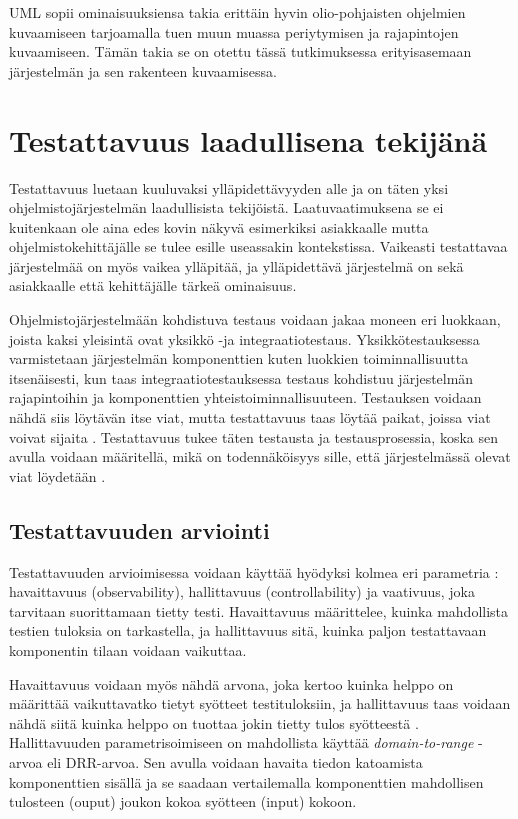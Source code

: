 \documentclass[finnish]{tktltiki2}
\numberwithin{table}{section}
\theoremstyle{definition}
\theoremstyle{remark}
\begin{document}
UML sopii ominaisuuksiensa takia erittäin hyvin olio-pohjaisten ohjelmien kuvaamiseen tarjoamalla tuen muun muassa periytymisen ja rajapintojen kuvaamiseen. Tämän takia se on otettu tässä tutkimuksessa erityisasemaan järjestelmän ja sen rakenteen kuvaamisessa.


\section{Testattavuus laadullisena tekijänä} \label{testability_main}
Testattavuus luetaan kuuluvaksi ylläpidettävyyden alle \citep{ISO/IEC25010:2011} ja on täten yksi ohjelmistojärjestelmän laadullisista tekijöistä. Laatuvaatimuksena se ei kuitenkaan ole aina edes kovin näkyvä esimerkiksi asiakkaalle mutta ohjelmistokehittäjälle se tulee esille useassakin kontekstissa. Vaikeasti testattavaa järjestelmää on myös vaikea ylläpitää, ja ylläpidettävä järjestelmä on sekä asiakkaalle että kehittäjälle tärkeä ominaisuus.

Ohjelmistojärjestelmään kohdistuva testaus voidaan jakaa moneen eri luokkaan, joista kaksi yleisintä ovat yksikkö -ja integraatiotestaus. Yksikkötestauksessa varmistetaan järjestelmän komponenttien kuten luokkien toiminnallisuutta itsenäisesti, kun taas integraatiotestauksessa testaus kohdistuu järjestelmän rajapintoihin ja komponenttien yhteistoiminnallisuuteen. Testauksen voidaan nähdä siis löytävän itse viat, mutta testattavuus taas löytää paikat, joissa viat voivat sijaita \citep[s. 19]{Voas:1995:STN:624607.625469}. Testattavuus tukee täten testausta ja testausprosessia, koska sen avulla voidaan määritellä, mikä on todennäköisyys sille, että järjestelmässä olevat viat löydetään \citep{voas_improving_1992}. 


\subsection{Testattavuuden arviointi} \label{contro_and_observ}

Testattavuuden arvioimisessa voidaan käyttää hyödyksi kolmea eri parametria \citep[s. 2]{baudry_measuring_2003}: havaittavuus (observability), hallittavuus (controllability) ja vaativuus, joka tarvitaan suorittamaan tietty testi. Havaittavuus määrittelee, kuinka mahdollista testien tuloksia on tarkastella, ja hallittavuus sitä, kuinka paljon testattavaan komponentin tilaan voidaan vaikuttaa. 

Havaittavuus voidaan myös nähdä arvona, joka kertoo kuinka helppo on määrittää vaikuttavatko tietyt syötteet testituloksiin, ja hallittavuus taas voidaan nähdä siitä kuinka helppo on tuottaa jokin tietty tulos syötteestä \citep[s. 554]{Freedman:1991:TSC:126218.126229}. 
Hallittavuuden parametrisoimiseen on mahdollista käyttää \textit{domain-to-range} -arvoa eli DRR-arvoa. Sen avulla voidaan havaita tiedon katoamista komponenttien sisällä \citep{Voas:1995:STN:624607.625469} ja se saadaan vertailemalla komponenttien mahdollisen tulosteen (ouput) joukon kokoa syötteen (input) kokoon. 
\end{document}
